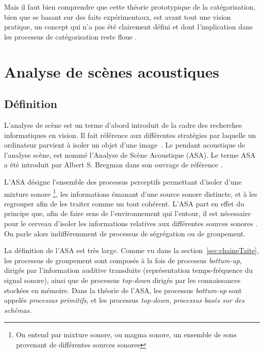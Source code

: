 Mais il faut bien comprendre que cette théorie prototypique de la catégorisation, bien que se basant sur des faits expérimentaux, est avant tout une vision pratique, un concept qui n'a pas été clairement défini et dont l'implication dans les processus de catégorisation reste floue \citep[p. 36-40]{rosch1978cognition} \citep[p. 49-54]{dubois1991semantique}.

\section{Analyse de scènes acoustiques}
\label{sec:ASA}

\subsection{Définition}
\label{sec:ASAintro}

L'analyse de scène est un terme d'abord introduit de la cadre des recherches informatiques en vision. Il fait référence aux différentes stratégies par laquelle un ordinateur parvient à isoler un objet d'une image~\citep[p. 12]{mcadams1994penser}. Le pendant acoustique de l'analyse scène, est nommé l'Analyse de Scène Acoustique (ASA). Le terme ASA a été introduit par Albert S. Bregman dans son ouvrage de référence \citep{bregman1994auditory}.  

L'ASA désigne l'ensemble des processus perceptifs permettant d'isoler d'une mixture sonore \footnote{On entend par mixture sonore, ou magma sonore, un ensemble de sons provenant de différentes sources sonores}, les informations émanant d'une source sonore distincte, et à les regrouper afin de les traiter comme un tout cohérent.  L'ASA part en effet du principe que, afin de faire sens de l'environnement qui l'entour, il est nécessaire pour le cerveau d'isoler les informations relatives aux différentes sources sonores \citep{winkler2009modeling}. On parle alors indifféremment de processus de ségrégation ou de groupement.

La définition de l'ASA est très large. Comme vu dans la section~\ref{sec:chaineTaite}, les processus de groupement sont composés à la fois de processus \emph{bottum-up}, \ie~ dirigés par l'information auditive transduite (représentation temps-fréquence du signal sonore), ainsi que de processus \emph{top-down} dirigés par les connaissances stockées en mémoire. Dans la théorie de l'ASA, les processus \emph{bottum-up} sont appelés \emph{processus primitifs}, et les processus  \emph{top-down}, \emph{processus basés sur des schémas}. 

